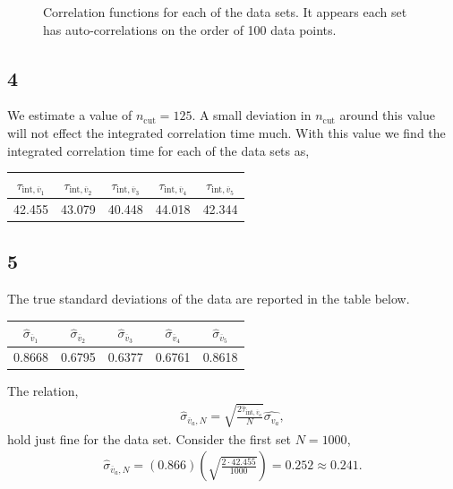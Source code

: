\documentclass[singlepage,notitlepage,nofootinbib,11pt]{revtex4-1}
\newcommand{\eq}[1]{\begin{align*}#1\end{align*}}
\def\l{\left}
\def\r{\right}
\begin{document}
\begin{figure}[h]
  \caption{\label{corrs} Correlation functions for each of the data sets. It appears each set has auto-correlations on the order of 100 data points.}
\end{figure}
\clearpage
\subsection{4}
We estimate a value of $n_{\text{cut}}=125$. A small deviation in $n_{\text{cut}}$ around this value will not effect the integrated correlation time much. With this value we find the integrated correlation time for each of the data sets as,
\begin{center}
\begin{tabular}{ | c | c | c | c | c |}\hline
  $\tau_{\text{int},\overline{v}_1}$ &  $\tau_{\text{int},\overline{v}_2}$ &  $\tau_{\text{int},\overline{v}_3}$ &  $\tau_{\text{int},\overline{v}_4}$ &  $\tau_{\text{int},\overline{v}_5}$  \\ \hline \hline 
  42.455 & 43.079 & 40.448 & 44.018 & 42.344 \\ \hline
\end{tabular}
\end{center}
\subsection{5}
The true standard deviations of the data are reported in the table below.
\begin{center}
\begin{tabular}{ | c | c | c | c | c |}\hline
  $\hat{\sigma}_{\overline{v}_1}$ &  $\hat{\sigma}_{\overline{v}_2}$ &  $\hat{\sigma}_{\overline{v}_3}$ &  $\hat{\sigma}_{\overline{v}_4}$ &  $\hat{\sigma}_{\overline{v}_5}$  \\ \hline \hline 
  0.8668 & 0.6795 & 0.6377 & 0.6761 & 0.8618 \\ \hline
\end{tabular}
\end{center}
The relation,
\eq{
\hat{\sigma}_{\overline{v}_a,N}=\sqrt{\frac{2\hat{\tau}_{\text{int},\overline{v}_a}}{N}}\hat{\sigma_{v_a}},
}
hold just fine for the data set. Consider the first set $N=1000$,
\eq{
\hat{\sigma}_{\overline{v}_a,N} = (0.866)\l(\sqrt{\frac{2\cdot42.455}{1000}}\r) =  0.252 \approx 0.241.
}
\end{document}
